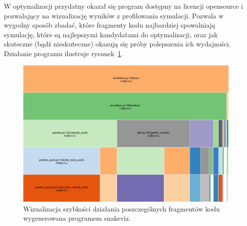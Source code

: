     W optymalizacji przydatny okazał się program  dostępny na
    licencji opensource i pozwalający na wizualizację wyników z profilowania
    symulacji. Pozwala w wygodny sposób zbadać, które fragmenty kodu najbardziej
    spowalniają symulację, które są najlepszymi kandydatami do optymalizacji, oraz
    jak skuteczne (bądź nieskuteczne) okazują się próby polepszenia ich wydajności.
    Działanie programu ilustruje rysunek~\ref{fig:snakeviz}.
    \begin{figure}[h!]
      \includegraphics[width=\textwidth]{Images/snakeviz}
      \caption{Wizualizacja szybkości działania poszczególnych fragmentów kodu
        wygenerowana programem snakeviz.}
      \label{fig:snakeviz}
    \end{figure}
